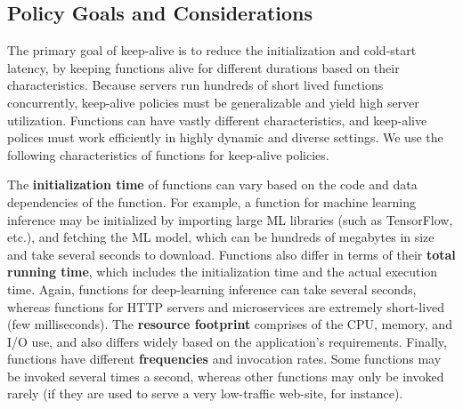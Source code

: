\subsection{Policy Goals and Considerations}


The primary goal of keep-alive is to reduce the initialization and cold-start latency, by keeping functions alive for different durations based on their characteristics. 
Because servers run hundreds of short lived functions concurrently, keep-alive policies must be generalizable and yield high server utilization. 
Functions can have vastly different characteristics, and keep-alive polices must work efficiently in highly dynamic and diverse settings. %
We use the following characteristics of functions for keep-alive policies.


The \textbf{initialization time} of functions can vary based on the code and data dependencies of the function.  
For example, a function for machine learning inference may be initialized by importing large ML libraries (such as TensorFlow, etc.), and fetching the ML model, which can be hundreds of megabytes in size and take several seconds to download. 
Functions also differ in terms of their \textbf{total running time}, which includes the initialization time and the actual execution time. 
Again, functions for deep-learning inference can take several seconds, whereas functions for HTTP servers and microservices are extremely short-lived (few milliseconds). 
The \textbf{resource footprint} comprises of the CPU, memory, and I/O use, and also differs widely based on the application's requirements. 
Finally, functions have different \textbf{frequencies} and invocation rates. Some functions may be invoked several times a second, whereas other functions may only be invoked rarely (if they are used to serve a very low-traffic web-site, for instance). 



